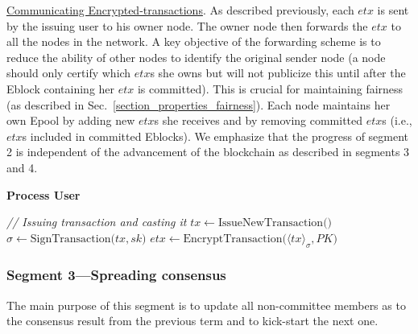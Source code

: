 \underline{Communicating Encrypted-transactions}.
As described previously, each $etx$ is sent by the issuing user to his owner node. The owner node then forwards the $etx$ to all the nodes in the network. A key objective of the forwarding scheme is to reduce the ability of other nodes to identify the original sender node (a node should only certify which $etx$s she owns but will not publicize this until after the Eblock containing her $etx$ is committed). This is crucial for maintaining fairness (as described in Sec.~\ref{section_properties_fairness}). Each node maintains her own Epool by adding new $etx$s she receives and by removing committed $etx$s (i.e., $etx$s included in committed Eblocks). We emphasize that the progress of segment 2 is independent of the advancement of the blockchain as described in segments 3 and 4. 

\begin{algorithm}
\caption*{\textbf{Process User}}\label{Process:User}
\begin{algorithmic}[1]
	\small
    
    \Statex {}
     \Statex {}
    \Statex   
	\Indent
    	\Statex \textit{// Issuing transaction and casting it}
		\State $tx \gets \text{IssueNewTransaction}\big(\big) $
		\State $\sigma \gets \text{SignTransaction}\big(tx, sk\big) $  
		\State $etx \gets \text{EncryptTransaction}\big(\langle tx \rangle _{\sigma}, PK\big) $
		\State {} 

	\EndIndent

\end{algorithmic}
\end{algorithm}

\subsubsection*{Segment 3---Spreading consensus}
\label{segment3}
The main purpose of this segment is to update all non-committee members as to the consensus result from the previous term and to kick-start the next one.    

